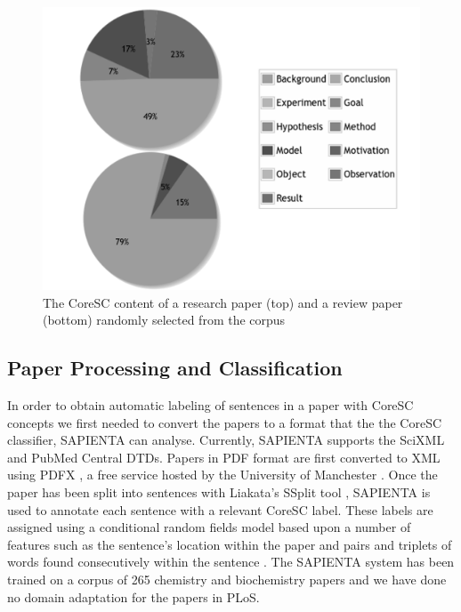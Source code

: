 \documentclass{svmult}
\begin{document}
\begin{figure}[t]
\centering
\includegraphics[width=\textwidth]{figures/corescs.png}
\caption{The CoreSC content of a research paper (top) and a review paper (bottom) randomly selected from the corpus}
\label{fig:coresc_pies} 
\end{figure}

\subsection{Paper Processing and Classification}

In order to obtain automatic labeling of sentences in a paper with CoreSC
concepts we first needed to convert the papers to a format that the the CoreSC
classifier, SAPIENTA can analyse.  Currently, SAPIENTA supports the SciXML and
PubMed Central DTDs.  Papers in PDF format are first converted to XML using
PDFX , a free service hosted by the University of Manchester
\cite{Constantin2013}. Once the paper has been split into sentences with
Liakata's SSplit tool \cite{liakata2009semantic}, SAPIENTA is used to annotate
each sentence with a relevant CoreSC label. These labels are assigned using a
conditional random fields model based upon a number of features such as the
sentence's location within the paper and pairs and triplets of words found
consecutively within the sentence \cite{Liakata2012}.  The SAPIENTA system has
been trained on a corpus of 265 chemistry and biochemistry papers and we have
done no domain adaptation for the papers in PLoS.
\end{document}
